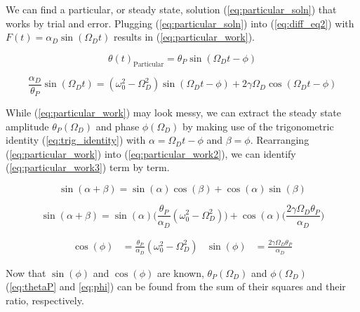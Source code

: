 \documentclass[notitlepage,aps,prd,nofootinbib]{revtex4-1}
\begin{document}
We can find a particular, or steady state, solution (\ref{eq:particular_soln}) that works by trial and error. Plugging (\ref{eq:particular_soln}) into (\ref{eq:diff_eq2}) with $F\left(t\right) = \alpha_{D} \sin\left(\Omega_{D} t\right)$ results in (\ref{eq:particular_work}).

\begin{equation} \label{eq:particular_soln}
\theta\left(t\right)_{\text{Particular}} = \theta_{P} \sin\left(\Omega_{D} t - \phi\right)
\end{equation}

\begin{equation} \label{eq:particular_work}
\frac{\alpha_{D}}{\theta_{P}} \sin\left(\Omega_{D} t\right) = \left(\omega_{0}^2 - \Omega_{D}^2\right) \sin\left(\Omega_{D} t - \phi\right) + 2 \gamma \Omega_{D} \cos\left(\Omega_{D} t - \phi\right)
\end{equation}

While (\ref{eq:particular_work}) may look messy, we can extract the steady state amplitude $\theta_{P}\left(\Omega_{D}\right)$ and phase $\phi\left(\Omega_{D}\right)$ by making use of the trigonometric identity (\ref{eq:trig_identity}) with $\alpha = \Omega_{D} t - \phi$ and $\beta = \phi$. Rearranging (\ref{eq:particular_work}) into (\ref{eq:particular_work2}), we can identify (\ref{eq:particular_work3}) term by term.

\begin{equation} \label{eq:trig_identity}
\sin\left(\alpha + \beta\right) = \sin\left(\alpha\right) \cos\left(\beta\right) + \cos\left(\alpha\right) \sin\left(\beta\right)
\end{equation}

\begin{equation} \label{eq:particular_work2}
\sin\left(\alpha + \beta\right) = \sin\left(\alpha\right) \bigg(\frac{\theta_{P}}{\alpha_{D}} \left(\omega_{0}^2 - \Omega_{D}^2\right)\bigg) + \cos\left(\alpha\right) \bigg(\frac{2 \gamma \Omega_{D} \theta_{P}}{\alpha_{D}}\bigg)
\end{equation}

\begin{align}
\label{eq:particular_work3}
\cos\left(\phi\right) &= \frac{\theta_{P}}{\alpha_{D}} \left(\omega_{0}^2 - \Omega_{D}^2\right)
&
\sin\left(\phi\right) &=  \frac{2 \gamma \Omega_{D} \theta_{P}}{\alpha_{D}}
\end{align}

Now that $\sin\left(\phi\right)$ and $\cos\left(\phi\right)$ are known, $\theta_{P}\left(\Omega_{D}\right)$ and $\phi\left(\Omega_{D}\right)$ (\ref{eq:thetaP} and \ref{eq:phi}) can be found from the sum of their squares and their ratio, respectively.
\end{document}

